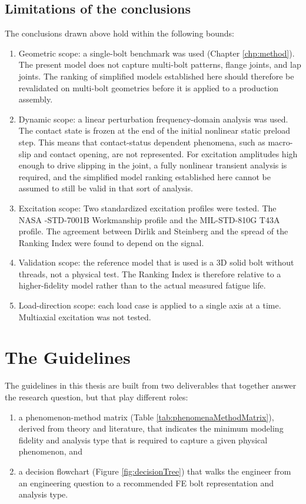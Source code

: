 \documentclass[a4paper,twoside]{bth}
\begin{document}
\subsection{Limitations of the conclusions} 
The conclusions drawn above hold within the following bounds:
\begin{enumerate}
    \item Geometric scope: a single-bolt benchmark was used (Chapter \ref{chp:method}). The present model does not capture multi-bolt patterns, flange joints, and lap joints. The ranking of simplified models established here should therefore be revalidated on multi-bolt geometries before it is applied to a production assembly.
    \item Dynamic scope: a linear perturbation frequency-domain analysis was used. The contact state is frozen at the end of the initial nonlinear static preload step. This means that contact-status dependent phenomena, such as macro-slip and contact opening, are not represented. For excitation amplitudes high enough to drive slipping in the joint, a fully nonlinear transient analysis is required, and the simplified model ranking established here cannot be assumed to still be valid in that sort of analysis.
    \item Excitation scope: Two standardized excitation profiles were tested. The NASA -STD-7001B Workmanship profile and the MIL-STD-810G T43A profile. The agreement between Dirlik and Steinberg and the spread of the Ranking Index were found to depend on the signal.
    \item Validation scope: the reference model that is used is a 3D solid bolt without threads, not a physical test. The Ranking Index is therefore relative to a higher-fidelity model rather than to the actual measured fatigue life.
    \item Load-direction scope: each load case is applied to a single axis at a time. Multiaxial excitation was not tested.
\end{enumerate}

\newpage
\section{The Guidelines} \label{sec:Deliverables}
The guidelines in this thesis are built from two deliverables that together answer the research question, but that play different roles:
\begin{enumerate}
    \item a phenomenon-method matrix (Table \ref{tab:phenomenaMethodMatrix}), derived from theory and literature, that indicates the minimum modeling fidelity and analysis type that is required to capture a given physical phenomenon, and
    \item a decision flowchart (Figure \ref{fig:decisionTree}) that walks the engineer from an engineering question to a recommended \ac{FE} bolt representation and analysis type.
\end{enumerate}
\end{document}
